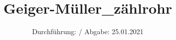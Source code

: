 

\subject{703}
\title{Geiger-Müller_zählrohr}
\date{%
  Durchführung: /
  \hspace{3em}
  Abgabe: 25.01.2021
}



\maketitle
\thispagestyle{empty}
\tableofcontents
\newpage






\printbibliography{}


